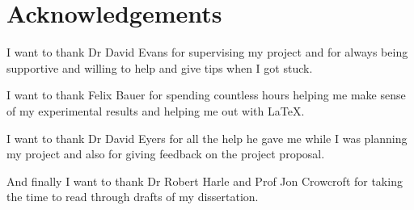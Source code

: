 \chapter{Acknowledgements}
I want to thank Dr David Evans for supervising my project and for always being supportive and willing to help and give tips when I got stuck.

I want to thank Felix Bauer for spending countless hours helping me make sense of my experimental results and helping me out with \LaTeX.

I want to thank Dr David Eyers for all the help he gave me while I was planning my project and also for giving feedback on the project proposal.

And finally I want to thank Dr Robert Harle and Prof Jon Crowcroft for taking the time to read through drafts of my dissertation.

